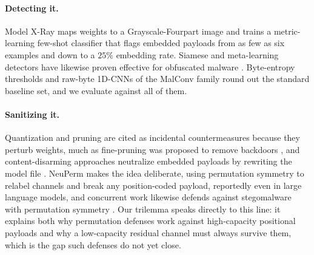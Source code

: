 \documentclass[10pt,journal]{IEEEtran}
\theoremstyle{remark}
\begin{document}
\paragraph{Detecting it.} Model X-Ray \cite{gilkarov2026modelxray}
maps weights to a Grayscale-Fourpart image and trains a metric-learning
few-shot classifier \cite{snell2017prototypical,vinyals2016matching} that flags
embedded payloads from as few as six examples and down to a $25\%$ embedding rate.
Siamese and meta-learning detectors have likewise proven effective for obfuscated
malware \cite{zhu2023taskaware}. Byte-entropy thresholds and raw-byte 1D-CNNs of the
MalConv family round out the standard baseline set, and we evaluate against all of
them.

\paragraph{Sanitizing it.} Quantization and pruning are cited as incidental
countermeasures because they perturb weights, much as fine-pruning was proposed to
remove backdoors \cite{liu2018finepruning}, and content-disarming approaches neutralize
embedded payloads by rewriting the model file \cite{dubin2023disarming}. NeuPerm
\cite{gilkarov2025neuperm} makes the idea deliberate, using permutation symmetry to relabel
channels and break any position-coded payload, reportedly even in large language models, and
concurrent work likewise defends against stegomalware with permutation symmetry
\cite{torpmannhagen2025permutation}. Our trilemma speaks directly to this line: it explains
both why permutation defenses work against high-capacity positional payloads and why a
low-capacity residual channel must always survive them, which is the gap such defenses do not
yet close.
\end{document}
